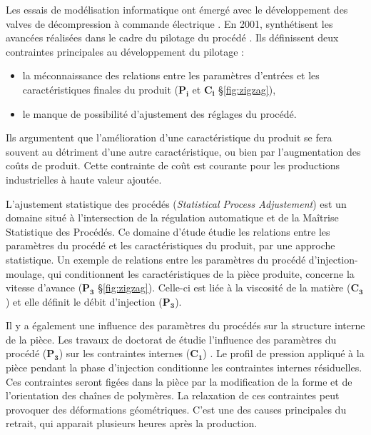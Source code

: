 Les essais de modélisation informatique ont émergé avec le développement des valves de décompression à commande électrique \cite{ma_design_1974}.
En 2001, \citeauthor{nwokah_control_2001} synthétisent les avancées réalisées dans le cadre du pilotage du procédé \cite{nwokah_control_2001}.
Ils définissent deux contraintes principales au développement du pilotage :
\begin{itemize}
\item la méconnaissance des relations entre les paramètres d’entrées et les caractéristiques finales du produit ($\boldsymbol{P_i}$ et $\boldsymbol{C_i}$ §\ref{fig:zigzag}),
\item le manque de possibilité d’ajustement des réglages du procédé.
\end{itemize}
Ils argumentent que l’amélioration d’une caractéristique du produit se fera souvent au détriment d’une autre caractéristique, ou bien par l'augmentation des coûts de produit.
Cette contrainte de coût est courante pour les productions industrielles à haute valeur ajoutée.

L’ajustement statistique des procédés (\textit{Statistical Process Adjustement}) est un domaine situé à l’intersection de la régulation automatique et de la Maîtrise Statistique des Procédés.
Ce domaine d'étude étudie les relations entre les paramètres du procédé et les caractéristiques du produit, par une approche statistique.
Un exemple de relations entre les paramètres du procédé d’injection-moulage, qui conditionnent les caractéristiques de la pièce produite, concerne la vitesse d'avance ($\boldsymbol{P_3}$ §\ref{fig:zigzag}).
Celle-ci est liée à la viscosité de la matière ($\boldsymbol{C_3}$) et elle définit le débit d’injection ($\boldsymbol{P_3}$).

Il y a également une influence des paramètres du procédés sur la structure interne de la pièce.
Les travaux de doctorat de \citeauthor{giroud_mesure_2001} étudie l'influence des paramètres du procédé ($\boldsymbol{P_3}$) sur les contraintes internes ($\boldsymbol{C_1}$) \cite{giroud_mesure_2001}.
Le profil de pression appliqué à la pièce pendant la phase d'injection conditionne les contraintes internes résiduelles.
Ces contraintes seront figées dans la pièce par la modification de la forme et de l'orientation des chaînes de polymères.
La relaxation de ces contraintes peut provoquer des déformations géométriques.
C'est une des causes principales du retrait, qui apparait plusieurs heures après la production.

